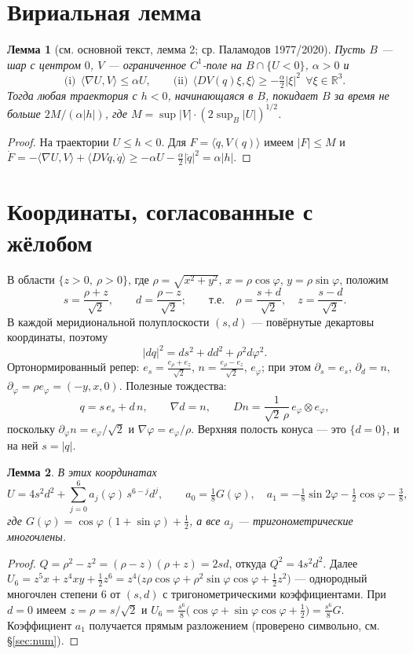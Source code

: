 \documentclass[11pt,a4paper]{article}
\newtheorem{lemma}{Лемма}
\theoremstyle{definition}
\newcommand{\R}{\mathbb R}
\begin{document}
\section{Вириальная лемма}
\begin{lemma}[см. основной текст, лемма 2; ср. Паламодов 1977/2020]\label{lem:virial}
Пусть $B$ --- шар с центром $0$, $V$ --- ограниченное $C^1$-поле на $B\cap\{U<0\}$, $\alpha>0$ и
\[
\text{(i)}\ \ \langle\nabla U,V\rangle\le\alpha U,\qquad
\text{(ii)}\ \ \langle DV(q)\xi,\xi\rangle\ge-\tfrac{\alpha}{2}|\xi|^2\ \ \forall\xi\in\R^3 .
\]
Тогда любая траектория с $h<0$, начинающаяся в $B$, покидает $B$ за время не больше
$2M/(\alpha|h|)$, где $M=\sup|V|\cdot(2\sup_B|U|)^{1/2}$.
\end{lemma}
\begin{proof}
На траектории $U\le h<0$. Для $F=\langle\dot q,V(q)\rangle$ имеем $|F|\le M$ и
$\dot F=-\langle\nabla U,V\rangle+\langle DV\dot q,\dot q\rangle\ge-\alpha U-\frac\alpha2|\dot q|^2=\alpha|h|$.
\end{proof}

\section{Координаты, согласованные с жёлобом}
В области $\{z>0,\ \rho>0\}$, где $\rho=\sqrt{x^2+y^2}$, $x=\rho\cos\varphi$, $y=\rho\sin\varphi$, положим
\[
s=\frac{\rho+z}{\sqrt2},\qquad d=\frac{\rho-z}{\sqrt2};\qquad\text{т.е.}\quad
\rho=\frac{s+d}{\sqrt2},\quad z=\frac{s-d}{\sqrt2}.
\]
В каждой меридиональной полуплоскости $(s,d)$ --- повёрнутые декартовы координаты, поэтому
\[
|dq|^2=ds^2+dd^2+\rho^2d\varphi^2 .
\]
Ортонормированный репер: $e_s=\frac{e_\rho+e_z}{\sqrt2}$, $n=\frac{e_\rho-e_z}{\sqrt2}$, $e_\varphi$; при этом
$\partial_s=e_s$, $\partial_d=n$, $\partial_\varphi=\rho e_\varphi=(-y,x,0)$. Полезные тождества:
\begin{equation}\label{eq:ident}
q=s\,e_s+d\,n,\qquad \nabla d=n,\qquad Dn=\frac{1}{\sqrt2\,\rho}\,e_\varphi\otimes e_\varphi,
\end{equation}
поскольку $\partial_\varphi n=e_\varphi/\sqrt2$ и $\nabla\varphi=e_\varphi/\rho$. Верхняя полость конуса --- это $\{d=0\}$,
и на ней $s=|q|$.

\begin{lemma}\label{lem:form}
В этих координатах
\[
U=4s^2d^2+\sum_{j=0}^{6}a_j(\varphi)\,s^{6-j}d^j,\qquad a_0=\tfrac18G(\varphi),\quad
a_1=-\tfrac18\sin2\varphi-\tfrac12\cos\varphi-\tfrac38,
\]
где $G(\varphi)=\cos\varphi\,(1+\sin\varphi)+\frac12$, а все $a_j$ --- тригонометрические многочлены.
\end{lemma}
\begin{proof}
$Q=\rho^2-z^2=(\rho-z)(\rho+z)=2sd$, откуда $Q^2=4s^2d^2$. Далее
$U_6=z^5x+z^4xy+\frac12z^6=z^4\bigl(z\rho\cos\varphi+\rho^2\sin\varphi\cos\varphi+\frac12z^2\bigr)$ ---
однородный многочлен степени 6 от $(s,d)$ с тригонометрическими коэффициентами. При $d=0$ имеем
$z=\rho=s/\sqrt2$ и $U_6=\frac{s^6}{8}\bigl(\cos\varphi+\sin\varphi\cos\varphi+\frac12\bigr)=\frac{s^6}{8}G$.
Коэффициент $a_1$ получается прямым разложением (проверено символьно, см. \S\ref{sec:num}).
\end{proof}
\end{document}

